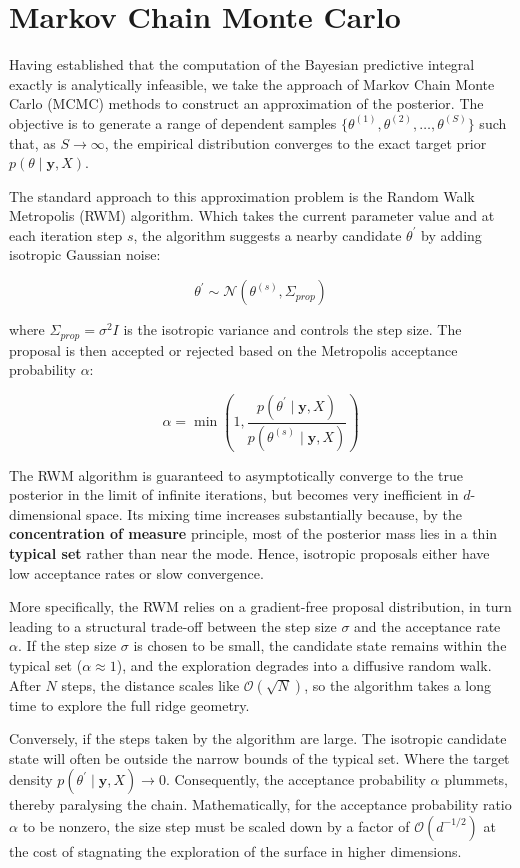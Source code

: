 \documentclass[12pt,oneside]{report}
\theoremstyle{definition}
\theoremstyle{remark}
\begin{document}
\section{Markov Chain Monte Carlo}
Having established that the computation of the Bayesian predictive integral exactly is analytically infeasible, we take the approach of Markov Chain Monte Carlo (MCMC) methods to construct an approximation of the posterior. The objective is to generate a range of dependent samples $\{\theta^{(1)}, \theta^{(2)}, \dots, \theta^{(S)}\}$ such that, as $S \to \infty$, the empirical distribution converges to the exact target prior $p(\theta \mid \mathbf{y}, X)$.

The standard approach to this approximation problem is the Random Walk Metropolis (RWM) algorithm. Which takes the current parameter value and at each iteration step $s$, the algorithm suggests a nearby candidate $\theta^\prime$ by adding isotropic Gaussian noise:

$$\theta^\prime \sim \mathcal{N}(\theta^{(s)}, \Sigma_{prop})$$


where $\Sigma_{prop} = \sigma^2 I$ is the isotropic variance and controls the step size. The proposal is then accepted or rejected based on the Metropolis acceptance probability $\alpha$:

$$\alpha = \min\left(1, \frac{p(\theta^\prime \mid \mathbf{y}, X)}{p(\theta^{(s)} \mid \mathbf{y}, X)}\right)$$

The RWM algorithm is guaranteed to asymptotically converge to the true posterior in the limit of infinite iterations, but becomes very inefficient in $d$-dimensional space. Its mixing time increases substantially because, by the \textbf{concentration of measure} principle, most of the posterior mass lies in a thin \textbf{typical set} rather than near the mode. Hence, isotropic proposals either have low acceptance rates or slow convergence.

More specifically, the RWM relies on a gradient-free proposal distribution, in turn leading to a structural trade-off between the step size $\sigma$ and the acceptance rate $\alpha$. If the step size $\sigma$ is chosen to be small, the candidate state remains within the typical set ($\alpha \approx 1$), and the exploration degrades into a diffusive random walk. After $N$ steps, the distance scales like $\mathcal{O}(\sqrt{N})$, so the algorithm takes a long time to explore the full ridge geometry.

Conversely, if the steps taken by the algorithm are large. The isotropic candidate state will often be outside the narrow bounds of the typical set. Where the target density $p(\theta^\prime \mid \mathbf{y}, X) \to 0$. Consequently, the acceptance probability $\alpha$ plummets, thereby paralysing the chain. Mathematically, for the acceptance probability ratio $\alpha$ to be nonzero, the size step must be scaled down by a factor of $\mathcal{O}(d^{-1/2})$ at the cost of stagnating the exploration of the surface in higher dimensions.
\end{document}
